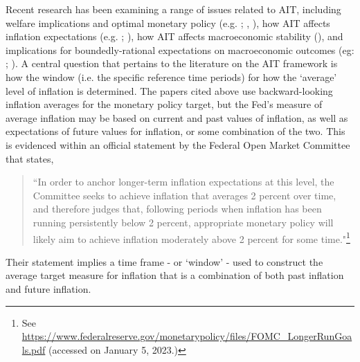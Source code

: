 \documentclass[english,authoryear,12pt]{elsarticle}
\begin{document}
Recent research has been examining a range of issues related to AIT, including welfare implications and optimal monetary policy (e.g. \citealp{budianto2020}; \citealp{eo2020}, \citealp{nessen2005}), how AIT affects inflation expectations (e.g. \citealp{coibion2020}; \citealp{hoffmann2022}), how AIT affects macroeconomic stability (\citealp{piergallini2022}), and implications for boundedly-rational expectations on macroeconomic outcomes (eg: \citealp{honka2021}; \citealp{budianto2020}). A central question that pertains to the literature on the AIT framework is how the window (i.e. the specific reference time periods) for how the `average' level of inflation is determined. The papers cited above use backward-looking inflation averages for the monetary policy target, but the Fed's measure of average inflation may be based on current and past values of inflation, as well as expectations of future values for inflation, or some combination of the two. This is evidenced within an official statement by the Federal Open Market Committee that states,

\vspace*{-1pc}\begin{quote}
	``In order to anchor longer-term inflation expectations at this level, the Committee seeks to achieve inflation that averages 2 percent over time, and therefore judges that, following periods when inflation has been running persistently below 2 percent, appropriate monetary policy will likely aim to achieve inflation moderately above 2 percent for some time."\footnote{See \url{https://www.federalreserve.gov/monetarypolicy/files/FOMC_LongerRunGoals.pdf} (accessed on January 5, 2023.)}
\end{quote}

\vspace*{-1pc} Their statement implies a time frame - or `window' - used to construct the average target measure for inflation that is a combination of both past inflation and future inflation.
\end{document}
